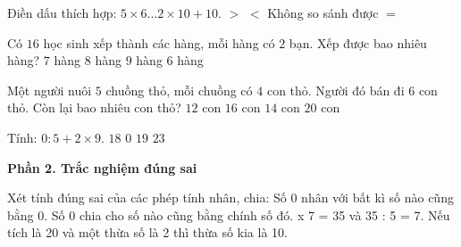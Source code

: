 \begin{ex} %
Điền dấu thích hợp: $5 \times 6 \dots 2 \times 10 + 10$.
\choice
{$>$}
{$<$}
{Không so sánh được}
{\True $=$}
\end{ex}

\begin{ex} %
Có $16$ học sinh xếp thành các hàng, mỗi hàng có $2$ bạn. Xếp được bao nhiêu hàng?
\choice
{$7$ hàng}
{\True $8$ hàng}
{$9$ hàng}
{$6$ hàng}
\end{ex}

\begin{ex} %
Một người nuôi $5$ chuồng thỏ, mỗi chuồng có $4$ con thỏ. Người đó bán đi $6$ con thỏ. Còn lại bao nhiêu con thỏ?
\choice
{$12$ con}
{$16$ con}
{\True $14$ con}
{$20$ con}
\end{ex}

\begin{ex} %
Tính: $0 : 5 + 2 \times 9$.
\choice
{\True $18$}
{$0$}
{$19$}
{$23$}
\end{ex}

\textbf{Phần 2. Trắc nghiệm đúng sai}

\begin{ex} %
Xét tính đúng sai của các phép tính nhân, chia:
\choiceTF
{\True Số 0 nhân với bất kì số nào cũng bằng 0.}
{Số 0 chia cho số nào cũng bằng chính số đó.}
{ x 7 = 35 và 35 : 5 = 7.}
{\True Nếu tích là 20 và một thừa số là 2 thì thừa số kia là 10.}
\end{ex}

